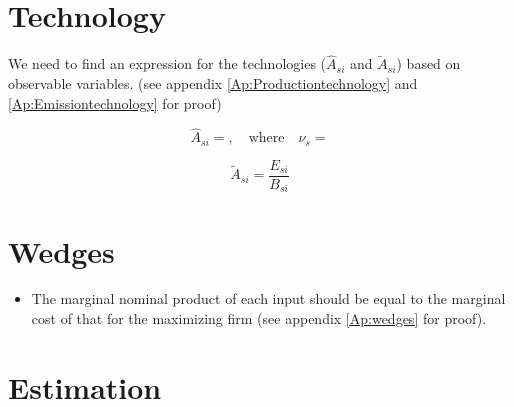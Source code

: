 \documentclass[12pt]{article} %
\begin{document}
\section*{Technology}
We need to find an expression for the technologies ($\hat{A}_{si}$ and $\tilde{A}_{si}$) based on observable variables. (see appendix \ref{Ap:Productiontechnology} and \ref{Ap:Emissiontechnology} for proof)

\begin{equation*}
    \hat{A}_{si} = , \quad \text{where} \quad \nu_s = 
\end{equation*}

\begin{equation*}
    \tilde{A}_{si} = \frac{E_{si}}{B_{si}}
\end{equation*}



\section*{Wedges}
\begin{itemize}
    \item The marginal nominal product of each input should be equal to the marginal cost of that for the maximizing firm (see appendix \ref{Ap:wedges} for proof).
	
\end{itemize}
\section*{Estimation}

\clearpage
\end{document}
